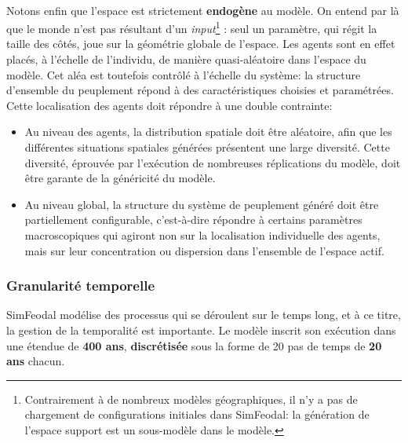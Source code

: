 

\paragraph[Endogène]{} Notons enfin que l'espace est strictement \textbf{endogène} au modèle.
On entend par là que le monde n'est pas résultant d'un \textit{input}\footnote{
	Contrairement à de nombreux modèles géographiques, il n'y a pas de chargement de configurations initiales dans SimFeodal: la génération de l'espace support est un sous-modèle dans le modèle.
} : seul un paramètre, qui régit la taille des côtés, joue sur la géométrie globale de l'espace.
Les agents sont en effet placés, à l'échelle de l'individu, de manière quasi-aléatoire dans l'espace du modèle.
Cet aléa est toutefois contrôlé à l'échelle du système: la structure d'ensemble du peuplement répond à des caractéristiques choisies et paramétrées.
Cette localisation des agents doit répondre à une double contrainte:
\begin{itemize}
	\item Au niveau des agents, la distribution spatiale doit être aléatoire, afin que les différentes situations spatiales générées présentent une large diversité.
	Cette diversité, éprouvée par l'exécution de nombreuses réplications du modèle, doit être garante de la généricité du modèle.
	\item Au niveau global, la structure du système de peuplement généré doit être partiellement configurable, c'est-à-dire répondre à certains paramètres macroscopiques qui agiront non sur la localisation individuelle des agents, mais sur leur concentration ou dispersion dans l'ensemble de l'espace \og actif\fg{}.
\end{itemize}


\subsubsection{Granularité temporelle}

SimFeodal modélise des processus qui se déroulent sur le temps long, et à ce titre, la gestion de la temporalité est importante.
Le modèle inscrit son exécution dans une étendue de \textbf{400 ans}, \textbf{discrétisée} sous la forme de 20 pas de temps de \textbf{20 ans} chacun.

